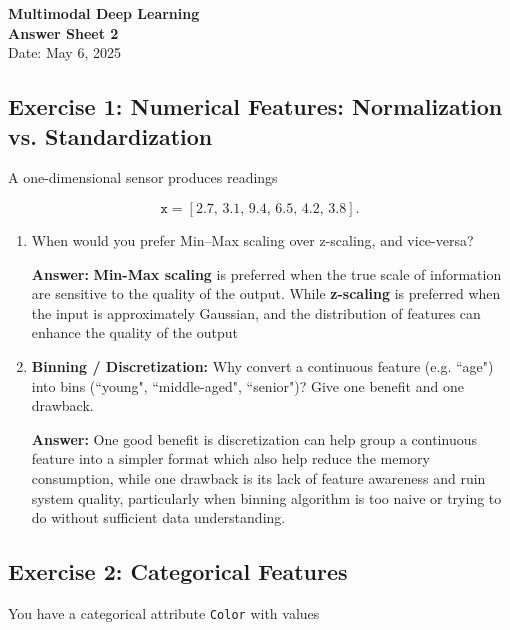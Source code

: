 \documentclass[11pt]{article}
\begin{document}
\begin{center}
    {\Large \textbf{Multimodal Deep Learning}} \\ [0.3em]
    {\large \textbf{Answer Sheet 2}} \\ [0.3em]
    \large Date: May 6, 2025
\end{center}

\vspace{1cm}

\subsection*{Exercise 1: Numerical Features: Normalization vs. Standardization}

\noindent
A one-dimensional sensor produces readings

\[
    \texttt{x} = [2.7, \, 3.1, \, 9.4, \, 6.5, \, 4.2, \, 3.8].
\]

\begin{enumerate}[start=3, label=(\alph*)]
    \item {
        When would you prefer Min–Max scaling over z-scaling, and vice-versa? 

        \textbf{Answer:} \textbf{Min-Max scaling} is preferred when the true scale of information are sensitive to the quality of the output.
        While \textbf{z-scaling} is preferred when the input is approximately Gaussian, and the distribution of features can enhance the quality of the output
        }
    \item {
        \textbf{Binning / Discretization:} Why convert a continuous feature (e.g. ``age") into bins (``young", ``middle-aged", ``senior")? Give one benefit and one drawback.
        
        \textbf{Answer:} One good benefit is discretization can help group a continuous feature into a simpler format which also help reduce the memory consumption, 
        while one drawback is its lack of feature awareness and ruin system quality, particularly when binning algorithm is too naive or trying to do without sufficient data understanding.
        }
\end{enumerate}

\subsection*{Exercise 2: Categorical Features}

\noindent
You have a categorical attribute \texttt{Color} with values
\end{document}
